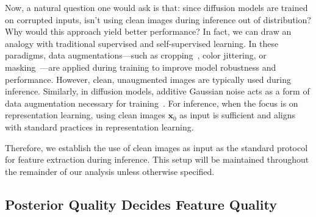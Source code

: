 {Now, a natural question one would ask is that: since diffusion models are trained on corrupted inputs, isn’t using clean images during inference out of distribution? Why would this approach yield better performance? In fact, we can draw an analogy with traditional supervised and self-supervised learning. In these paradigms, data augmentations—such as cropping~\cite{caron2021emerging}, color jittering, or masking~\cite{he2022masked}—are applied during training to improve model robustness and performance. However, clean, unaugmented images are typically used during inference. Similarly, in diffusion models, additive Gaussian noise acts as a form of data augmentation necessary for training~\cite{chen2024deconstructing}. For inference, when the focus is on representation learning, using clean images $\bm{x}_0$ as input is sufficient and aligns with standard practices in representation learning. 

Therefore, we establish the use of clean images as input as the standard protocol for feature extraction during inference. This setup will be maintained throughout the remainder of our analysis unless otherwise specified.


\subsection{Posterior Quality Decides Feature Quality}\label{subsec:posterior}

}
